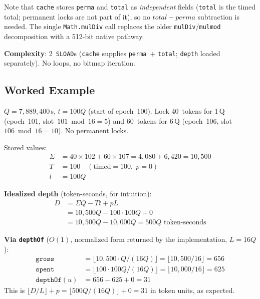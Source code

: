 \documentclass[10pt,a4paper,twocolumn]{article}
\begin{document}
Note that \texttt{cache} stores \texttt{perma} and \texttt{total} as \emph{independent} fields (\texttt{total} is the timed total; permanent locks are not part of it), so no $\mathit{total}-\mathit{perma}$ subtraction is needed. The single \texttt{Math.mulDiv} call replaces the older \texttt{mulDiv}/\texttt{mulmod} decomposition with a 512-bit native pathway.

\textbf{Complexity}: 2~\texttt{SLOAD}s (\texttt{cache} supplies \texttt{perma}~+ \texttt{total}; \texttt{depth} loaded separately). No loops, no bitmap iteration.

\FloatBarrier

\subsection{Worked Example}
\label{subsec:worked-example}

\begin{definition}[Setup]
$Q = 7{,}889{,}400$\,s, $t = 100Q$ (start of epoch~100). Lock 40~tokens for 1\,Q (epoch~101, slot~$101 \bmod 16 = 5$) and 60~tokens for 6\,Q (epoch~106, slot~$106 \bmod 16 = 10$). No permanent locks.
\end{definition}

Stored values:
\begin{align*}
\Sigma &= 40 \times 102 + 60 \times 107 = 4{,}080 + 6{,}420 = 10{,}500 \\
T &= 100 \quad (\text{timed} = 100, \; p = 0) \\
t &= 100Q
\end{align*}

\textbf{Idealized depth} (token-seconds, for intuition):
\begin{align*}
D &= \Sigma Q - Tt + pL \\
  &= 10{,}500Q - 100 \cdot 100Q + 0 \\
  &= 10{,}500Q - 10{,}000Q = 500Q \text{ token-seconds}
\end{align*}

\textbf{Via \texttt{depthOf}} ($O(1)$, normalized form returned by the implementation, $L = 16Q$):
\begin{align*}
\texttt{gross}      &= \lfloor 10{,}500 \cdot Q / (16Q) \rfloor = \lfloor 10{,}500/16 \rfloor = 656 \\
\texttt{spent}      &= \lfloor 100 \cdot 100Q / (16Q) \rfloor   = \lfloor 10{,}000/16 \rfloor = 625 \\
\texttt{depthOf}(u) &= 656 - 625 + 0 = 31
\end{align*}
This is $\lfloor D/L \rfloor + p = \lfloor 500Q/(16Q) \rfloor + 0 = 31$ in token units, as expected.
\end{document}
